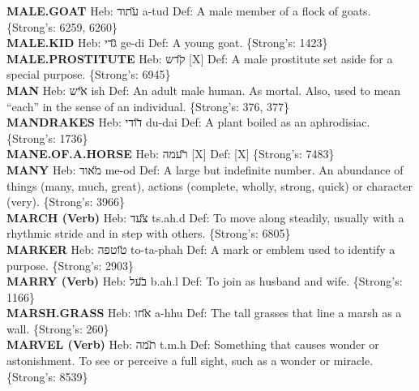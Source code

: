 {\textbf{MALE.GOAT} Heb: {\large\H עתוד} a-tud Def: A male member of a flock of goats. \{Strong's: 6259, 6260\}\hfill{}\\

\textbf{MALE.KID} Heb: {\large\H גדי} ge-di Def: A young goat. \{Strong's: 1423\}\hfill{}\\

\textbf{MALE.PROSTITUTE} Heb: {\large\H קדש} {[}X{]} Def: A male prostitute set aside for a special purpose. \{Strong's: 6945\}\hfill{}\\

\textbf{MAN} Heb: {\large\H איש} ish Def: An adult male human. As mortal. Also, used to mean ``each'' in the sense of an individual. \{Strong's: 376, 377\}\hfill{}\\

\textbf{MANDRAKES} Heb: {\large\H דודי} du-dai Def: A plant boiled as an aphrodisiac. \{Strong's: 1736\}\hfill{}\\

\textbf{MANE.OF.A.HORSE} Heb: {\large\H רעמה} {[}X{]} Def: {[}X{]} \{Strong's: 7483\}\hfill{}\\

\textbf{MANY} Heb: {\large\H מאוד} me-od Def: A large but indefinite number. An abundance of things (many, much, great), actions (complete, wholly, strong, quick) or character (very). \{Strong's: 3966\}\hfill{}\\

\textbf{MARCH (Verb)} Heb: {\large\H צעד} ts.ah.d Def: To move along steadily, usually with a rhythmic stride and in step with others. \{Strong's: 6805\}\hfill{}\\

\textbf{MARKER} Heb: {\large\H טוטפה} to-ta-phah Def: A mark or emblem used to identify a purpose. \{Strong's: 2903\}\hfill{}\\

\textbf{MARRY (Verb)} Heb: {\large\H בעל} b.ah.l Def: To join as husband and wife. \{Strong's: 1166\}\hfill{}\\

\textbf{MARSH.GRASS} Heb: {\large\H אחו} a-hhu Def: The tall grasses that line a marsh as a wall. \{Strong's: 260\}\hfill{}\\

\textbf{MARVEL (Verb)} Heb: {\large\H תמה} t.m.h Def: Something that causes wonder or astonishment. To see or perceive a full sight, such as a wonder or miracle. \{Strong's: 8539\}\hfill{}\\

}
